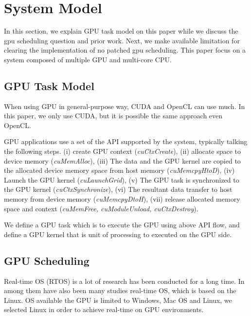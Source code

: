 \section{System Model}\label{sec:system_model}
In this section, we explain GPU task model on this paper while we discuss the gpu scheduling question and prior work.
Next, we make available limitation for clearing the implementation of no patched gpu scheduling.
This paper focus on a system composed of multiple GPU and multi-core CPU.

\subsection{GPU Task Model}
When using GPU in general-purpose way, CUDA and OpenCL can use much.
In this paper, we only use CUDA, but it is possible the same approach even OpenCL.

GPU applications use a set of the API supported by the system,
typically talking the following steps.
(i) create GPU context (\textit{cuCtxCreate}), 
(ii) allocate space to device memory (\textit{cuMemAlloc}), 
(iii) The data and the GPU kernel are copied to the allocated device memory space from host memory (\textit{cuMemcpyHtoD}), 
(iv) Launch the GPU kernel (\textit{cuLaunchGrid}), 
(v) The GPU task is synchronized to the GPU kernel (\textit{cuCtxSynchronize}), 
(vi) The resultant data transfer to host memory from device memory (\textit{cuMemcpyDtoH}), 
(vii) release allocated memory space and context (\textit{cuMemFree, cuModuleUnload, cuCtxDestroy}).

We define a GPU task which is to execute the GPU using above API flow,
and define a GPU kernel that is unit of processing to executed on the GPU side.


\subsection{GPU Scheduling}
Real-time OS (RTOS) is a lot of research\cite{spring, redline,itron,rk} has been conducted for a long time.
In among them have also been many studies\cite{prk,rtai,yodaiken1999rtlinux,litmus,kato:loadable} real-time OS, which is based on the Linux.
OS available the GPU is limited to Windows, Mac OS and Linux,
we selected Linux in order to achieve real-time on GPU environments.

